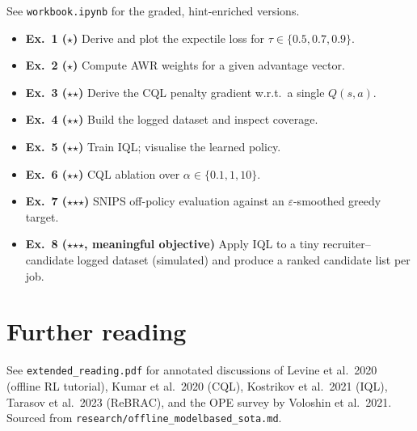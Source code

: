 \documentclass[11pt,oneside]{scrbook}
\begin{document}
See \texttt{workbook.ipynb} for the graded, hint-enriched versions.
\begin{itemize}
  \item \textbf{Ex.\ 1 ($\star$)} Derive and plot the expectile loss for $\tau \in \{0.5, 0.7, 0.9\}$.
  \item \textbf{Ex.\ 2 ($\star$)} Compute AWR weights for a given advantage vector.
  \item \textbf{Ex.\ 3 ($\star$$\star$)} Derive the CQL penalty gradient w.r.t.\ a single $Q(s,a)$.
  \item \textbf{Ex.\ 4 ($\star$$\star$)} Build the logged dataset and inspect coverage.
  \item \textbf{Ex.\ 5 ($\star$$\star$)} Train IQL; visualise the learned policy.
  \item \textbf{Ex.\ 6 ($\star$$\star$)} CQL ablation over $\alpha \in \{0.1, 1, 10\}$.
  \item \textbf{Ex.\ 7 ($\star$$\star$$\star$)} SNIPS off-policy evaluation against an $\varepsilon$-smoothed greedy target.
  \item \textbf{Ex.\ 8 ($\star$$\star$$\star$, meaningful objective)} Apply IQL to a tiny recruiter--candidate
        logged dataset (simulated) and produce a ranked candidate list per job.
\end{itemize}

\chapter{Further reading}

See \texttt{extended\_reading.pdf} for annotated discussions of Levine et al.\ 2020
(offline RL tutorial), Kumar et al.\ 2020 (CQL), Kostrikov et al.\ 2021 (IQL),
Tarasov et al.\ 2023 (ReBRAC), and the OPE survey by Voloshin et al.\ 2021.
Sourced from \texttt{research/offline\_modelbased\_sota.md}.
\end{document}
